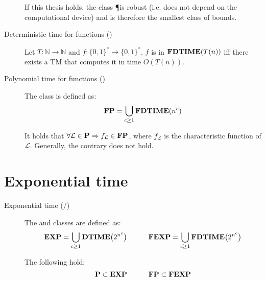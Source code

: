 \begin{description}
        \begin{remark}
            If this thesis holds, the class \P is robust 
            (i.e. does not depend on the computational device)
            and is therefore the smallest class of bounds.
        \end{remark}

    \item[Deterministic time for functions (\FDTIME)] 
        Let $T: \mathbb{N} \rightarrow \mathbb{N}$ and 
        $f: \{0, 1\}^* \rightarrow \{0, 1\}^*$.
        $f$ is in $\textbf{FDTIME}(T(n))$ iff
        there exists a TM that computes it in time $O(T(n))$.

    \item[Polynomial time for functions (\FP)] 
        The class \FP is defined as:
        \[ \textbf{FP} = \bigcup_{c \geq 1} \textbf{FDTIME}(n^c) \]
        
        \begin{remark}
            It holds that $\forall \mathcal{L} \in \textbf{P} \Rightarrow f_\mathcal{L} \in \textbf{FP}$,
            where $f_\mathcal{L}$ is the characteristic function of $\mathcal{L}$.
            Generally, the contrary does not hold.
        \end{remark}
\end{description}



\section{Exponential time}

\begin{description}
    \item[Exponential time (\EXP/\FEXP)] 
        The \EXP and \FEXP classes are defined as:
        \[
            \textbf{EXP} = \bigcup_{c \geq 1} \textbf{DTIME}\big( 2^{n^c} \big) \hspace{3em} 
            \textbf{FEXP} = \bigcup_{c \geq 1} \textbf{FDTIME}\big( 2^{n^c} \big)
        \]

        \begin{theorem}
            The following hold:
            \[ \textbf{P} \subset \textbf{EXP} \hspace{3em} \textbf{FP} \subset \textbf{FEXP} \]
        \end{theorem}
\end{description}



